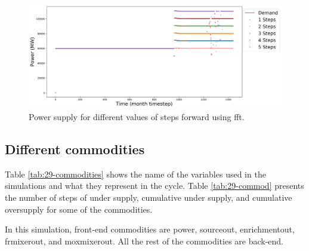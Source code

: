 \documentclass[11pt]{article}
\begin{document}
\begin{figure}[H]
	\centering
	\includegraphics[width=\textwidth]{29-figures/29-power-buffer0-fft-steps.png} 
	\hfill
	\caption{Power supply for different values of steps forward using fft.}
	\label{fig:29-ste-fft}
\end{figure}

\subsection{Different commodities}

Table \ref{tab:29-commodities} shows the name of the variables used in the simulations and what they represent in the cycle. Table \ref{tab:29-commod} presents the number of steps of under supply, cumulative under supply, and cumulative oversupply for some of the commodities.

In this simulation, front-end commodities are power, sourceout, enrichmentout, frmixerout, and moxmixerout. All the rest of the commodities are back-end.
\end{document}
